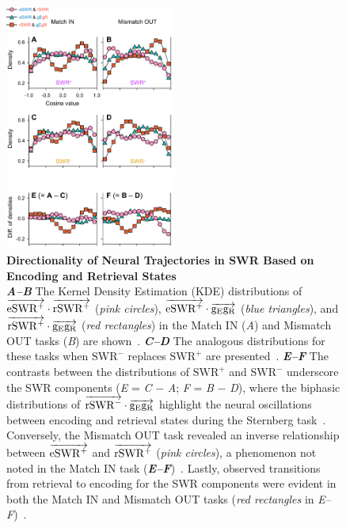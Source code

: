 \documentclass[final,3p,times,twocolumn]{elsarticle}
\begin{document}
        \clearpage
        \begin{figure}[ht]
        	\centering
            \includegraphics[width=0.5\textwidth]{./src/figures/.png/Figure_ID_07.png}
        	\caption{\textbf{
Directionality of Neural Trajectories in SWR Based on Encoding and Retrieval States
}
\smallskip
\\
\textbf{\textit{A--B}} The Kernel Density Estimation (KDE) distributions of $\protect\overrightarrow{{\mathrm{eSWR^+}}} \cdot \protect\overrightarrow{{\mathrm{rSWR^+}}}$ (\textit{pink circles}), $\protect\overrightarrow{{\mathrm{eSWR^+}}} \cdot \protect\overrightarrow{{\mathrm{g_{E}g_{R}}}}$ (\textit{blue triangles}), and $\protect\overrightarrow{{\mathrm{rSWR^+}}} \cdot \protect\overrightarrow{{\mathrm{g_{E}g_{R}}}}$ (\textit{red rectangles}) in the Match IN (\textit{A}) and Mismatch OUT tasks (\textit{B}) are shown~\cite{li_functional_2023}. \textbf{\textit{C--D}} The analogous distributions for these tasks when $\mathrm{SWR^-}$ replaces $\mathrm{SWR^+}$ are presented~\cite{dimakopoulos_information_2022}. \textbf{\textit{E--F}} The contrasts between the distributions of $\mathrm{SWR^+}$ and $\mathrm{SWR^-}$ underscore the SWR components (\textit{E} = \textit{C} $-$ \textit{A}; \textit{F} = \textit{B} $-$ \textit{D}), where the biphasic distributions of $\protect\overrightarrow{{\mathrm{rSWR^-}}} \cdot \protect\overrightarrow{{\mathrm{g_{E}g_{R}}}}$ highlight the neural oscillations between encoding and retrieval states during the Sternberg task~\cite{borders_hippocampus_2022}. Conversely, the Mismatch OUT task revealed an inverse relationship between $\protect\overrightarrow{{\mathrm{eSWR^+}}}$ and $\protect\overrightarrow{{\mathrm{rSWR^+}}}$ (\textit{pink circles}), a phenomenon not noted in the Match IN task (\textbf{\textit{E--F}})~\cite{naber_reciprocal_2001,van_strien_anatomy_2009}. Lastly, observed transitions from retrieval to encoding for the SWR components were evident in both the Match IN and Mismatch OUT tasks (\textit{red rectangles} in \textit{E--F})~\cite{niediek_reliable_2016,schomburg_spiking_2012}.
}
        	\label{fig:07}
        \end{figure}


\end{document}
